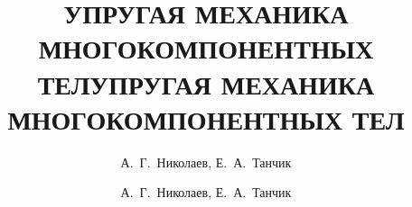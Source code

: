 \documentclass[book,14pt,small,twoside]{ncc}
\begin{document}
\indentaftersection
{}

\titlehead{МИНИСТЕРСТВО ОБРАЗОВАНИЯ И НАУКИ УКРАИНЫ \\
Национальный аэрокосмический университет им.~Н.~Е.~Жуковского \\
``Харьковский авиационный институт''}
\author{А.~Г.~Николаев, Е.~А.~Танчик}
\title{УПРУГАЯ МЕХАНИКА МНОГОКОМПОНЕНТНЫХ ТЕЛ}
\maketitle
\titlehead{}
\titlefoot{\theyear}
\author{А.~Г.~Николаев, Е.~А.~Танчик}
\title{УПРУГАЯ МЕХАНИКА МНОГОКОМПОНЕНТНЫХ ТЕЛ}
\maketitle
\abstractstyle{
\small
}
\end{document}
